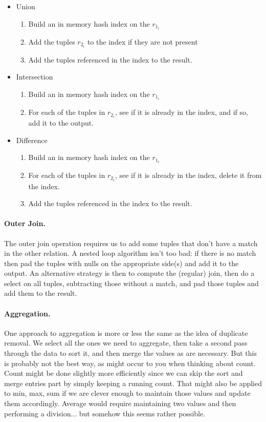 \begin{itemize}
	\item Union
	\begin{enumerate}
		\item Build an in memory hash index on the $r_{1_{i}}$
		\item Add the tuples $r_{2_{i}}$ to the index if they are not present
		\item Add the tuples referenced in the index to the result.
	\end{enumerate}
	
	\item Intersection
	\begin{enumerate}
		\item Build an in memory hash index on the $r_{1_{i}}$
		\item For each of the tuples in $r_{2_{i}}$, see if it is already in the index, and if so, add it to the output.
	\end{enumerate}
	
	\item Difference
	\begin{enumerate}
		\item Build an in memory hash index on the $r_{1_{i}}$
		\item For each of the tuples in $r_{2_{i}}$, see if it is already in the index, delete it from the index.
		\item Add the tuples referenced in the index to the result.
	\end{enumerate}

\end{itemize}

\paragraph{Outer Join.}
The outer join operation requires us to add some tuples that don't have a match in the other relation. A nested loop algorithm isn't too bad: if there is no match then pad the tuples with nulls on the appropriate side(s) and add it to the output. An alternative strategy is then to compute the (regular) join, then do a select on all tuples, subtracting those without a match, and pad those tuples and add them to the result.

\paragraph{Aggregation.} One approach to aggregation is more or less the same as the idea of duplicate removal. We select all the ones we need to aggregate, then take a second pass through the data to sort it, and then merge the values as are necessary. But this is probably not the best way, as might occur to you when thinking about count. Count might be done slightly more efficiently since we can skip the sort and merge entries part by simply keeping a running count. That might also be applied to min, max, sum if we are clever enough to maintain those values and update them accordingly. Average would require maintaining two values and then performing a division... but somehow this seems rather possible.

